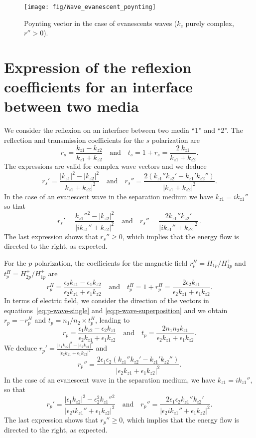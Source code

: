 \begin{figure}[!h]
\texttt{[image: fig/Wave\_evanescent\_poynting]}
\caption{\label{fig:Wave_evanescent_poynting}Poynting vector in the case of evanescents waves ($k_z$ purely complex, $r''>0$).}
\end{figure}

\section{Expression of the reflexion coefficients for an interface between two media}

We consider the reflexion on an interface between two media ``1'' and ``2''.
The reflection and transmission coefficients for the $s$ polarization are\cite{Wikipedia_Fresnel}
$$
r_s = \frac{k_{z1}-k_{z2}}{k_{z1}+k_{z2}} 
\quad\textrm{and}\quad
t_s = 1 + r_s = \frac{2\ k_{z1}}{k_{z1}+k_{z2}}.
$$
The expressions are valid for complex wave vectors and we deduce
$$
r_s' = \frac{|k_{z1}|^2 - |k_{z2}|^2}{|k_{z1} + k_{z2}|^2}
\quad\textrm{and}\quad
r_s'' = \frac{2 (k_{z1}'' k_{z2}' - k_{z1}' k_{z2}'')}{|k_{z1} + k_{z2}|^2}.
$$
In the case of an evanescent wave in the separation medium we have $k_{z1} = i k_{z1}''$ so that
$$
r_s' = \frac{k_{z1}''^2 - |k_{z2}|^2}{|ik_{z1}'' + k_{z2}|^2}
\quad\textrm{and}\quad
r_s'' = \frac{2 k_{z1}'' k_{z2}'}{|ik_{z1}'' + k_{z2}|^2}
\ .
$$
The last expression shows that $r_s'' \ge 0$, which implies that the energy flow is directed to the right, as expected.

For the $p$ polarization, the coefficients for the magnetic field 
$r^H_p = H^-_{1p} / H^+_{1p}$ and $t^H_p = H^+_{2p} / H^+_{1p}$ are
$$
r^H_p=\frac{\epsilon_2k_{z1}-\epsilon_1k_{z2}}{\epsilon_2k_{z1}+\epsilon_1k_{z2}}
\quad\textrm{and}\quad
t^H_p = 1+r^H_p = \frac{2\epsilon_2 k_{z1}}{\epsilon_2k_{z1}+\epsilon_1k_{z2}}
.
$$
In terms of electric field, we consider the direction of the vectors in equations~\ref{eq:p-wave-single} and \ref{eq:p-wave-superposition} and we obtain $r_p=-r^H_p$ and $t_p = n_1/n_2 \times t^H_p$, leading to \cite{Wikipedia_Fresnel}
$$
r_p=
\frac{\epsilon_1k_{z2} - \epsilon_2k_{z1}}{\epsilon_2k_{z1}+\epsilon_1k_{z2}}
\quad\textrm{and}\quad 
t_p = 
\frac{2 n_1 n_2 k_{z1}}{\epsilon_2k_{z1}+\epsilon_1k_{z2}}.
$$
We deduce
$ \displaystyle
r_p' = \frac{|\epsilon_1 k_{z2}|^2 - |\epsilon_2 k_{z1}|^2}{|\epsilon_2 k_{z1} + \epsilon_1 k_{z2}|^2}$ 
and
$$
r_p'' = \frac{2 \epsilon_1\epsilon_2(k_{z1}'' k_{z2}' - k_{z1}' k_{z2}'')}{|\epsilon_2 k_{z1} + \epsilon_1 k_{z2}|^2}.
$$
In the case of an evanescent wave in the separation medium, we have $k_{z1} = i k_{z1}''$, so that
$$
r_p' = \frac{|\epsilon_1 k_{z2}|^2 - \epsilon_2^2 k_{z1}''^2}{|\epsilon_2 i k_{z1}'' + \epsilon_1 k_{z2}|^2}
\quad\textrm{and}\quad
r_p'' =  \frac{2 \epsilon_1\epsilon_2 k_{z1}'' k_{z2}'}{|\epsilon_2 i k_{z1}'' + \epsilon_1 k_{z2}|^2}
.
$$
The last expression shows that $r_p''\ge 0$, which implies that the energy flow is directed to the right, as expected.

